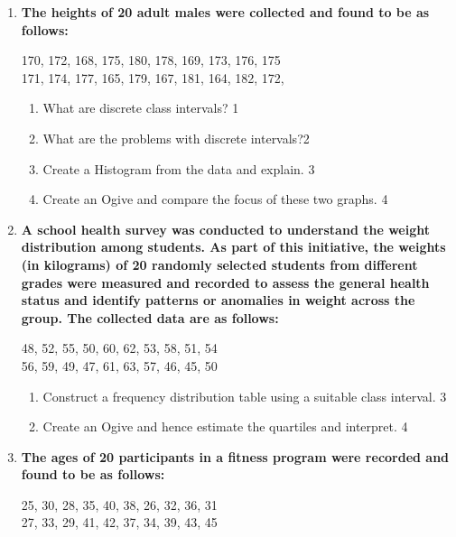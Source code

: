 \documentclass[a4paper,oneside]{book}
\begin{document}
\begin{enumerate}
   \item
	  \textbf{The heights of 20 adult males were collected and found to be as follows:}
	  \begin{center}
	  170, 172, 168, 175, 180, 178, 169, 173, 176, 175 \\
	  171, 174, 177, 165, 179, 167, 181, 164, 182, 172,  \\
	  \end{center}
  
  \begin{enumerate}
    \item
	What are discrete class intervals? \hfill 1
    \item
	What are the problems with discrete intervals?\hfill 2
    \item  
	Create a Histogram from the data  and explain. \hfill 3
    \item
	Create an Ogive and compare the focus of these two graphs. \hfill 4
  \end{enumerate}
  
  \item
  \textbf{A school health survey was conducted to understand the weight distribution among students. As part of this initiative, the weights (in kilograms) of 20 randomly selected students from different grades were measured and recorded to assess the general health status and identify patterns or anomalies in weight across the group. The collected data are as follows:}

  \begin{center}
  48, 52, 55, 50, 60, 62, 53, 58, 51, 54 \\
  56, 59, 49, 47, 61, 63, 57, 46, 45, 50 \\
  \end{center}

\begin{enumerate}
  \item  
  Construct a frequency distribution table using a suitable class interval. \hfill 3

  \item
  Create an Ogive and hence estimate the quartiles and interpret. \hfill 4
\end{enumerate}

  
  \item
  \textbf{The ages of 20 participants in a fitness program were recorded and found to be as follows:}
  \begin{center}
  25, 30, 28, 35, 40, 38, 26, 32, 36, 31 \\
  27, 33, 29, 41, 42, 37, 34, 39, 43, 45 \\
  \end{center}


\end{enumerate}
\end{document}
